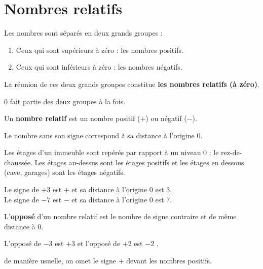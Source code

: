 \section{Nombres relatifs}
\begin{definition}
    Les nombres sont séparés en deux grands groupes :
    \begin{enumerate}
        \item Ceux qui sont \colorbox{A1!30}{supérieurs} à zéro : les nombres \colorbox{A1!30}{positifs}.
        \item Ceux qui sont \colorbox{B1!30}{inférieurs} à zéro : les nombres \colorbox{B1!30}{négatifs}.
    \end{enumerate}
    La réunion de ces deux grands groupes constitue \textbf{les nombres relatifs (à zéro)}.
\end{definition}
\begin{remarque}
    $0$ fait partie des deux groupes à la fois.
\end{remarque}
\begin{definition}
   Un {\bf nombre relatif} est un nombre positif ($+$) ou négatif ($-$).
   
   Le nombre sans son signe correspond à sa distance à l'origine 0.
\end{definition}
\begin{exemple*1}
   Les étages d'un immeuble sont  repérés par rapport à un niveau 0 : le rez-de-chaussée. Les étages au-dessus sont les étages positifs et les étages en dessous (cave, garages) sont les étages négatifs.
\end{exemple*1}
\begin{exemple*1}
   Le signe de $+3$ est $+$ et sa distance à l'origine 0 est 3. \\
   Le signe de $-7$ est $-$ et sa distance à l'origine 0 est 7.  
\end{exemple*1}
\begin{definition}
   L'{\bf opposé} d'un nombre relatif est le nombre de signe contraire et de même	
distance à 0.
\end{definition}
\begin{exemple*1}
   L'opposé de $-3$ est $+3$ et l'opposé de $+2$ est $-2$ .
\end{exemple*1}
\begin{remarque}
   de manière usuelle, on omet le signe \og $+$ \fg{} devant les nombres positifs.
\end{remarque}